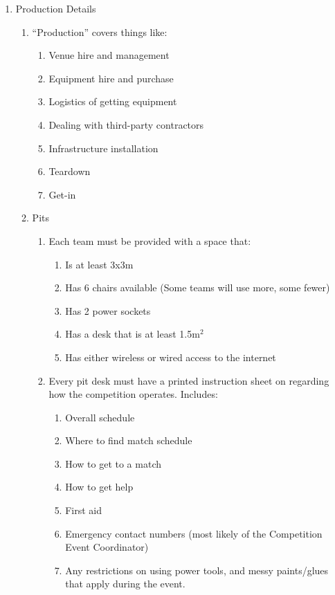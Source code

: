 \begin{enumerate}
\item Production Details
  \begin{enumerate}
  \item ``Production'' covers things like:
    \begin{enumerate}
    \item Venue hire and management
    \item Equipment hire and purchase
    \item Logistics of getting equipment
    \item Dealing with third-party contractors
    \item Infrastructure installation
    \item Teardown
    \item Get-in
    \end{enumerate}

  \item Pits
    \begin{enumerate}
    \item Each team must be provided with a space that:
      \begin{enumerate}
      \item Is at least 3x3m
      \item Has 6 chairs available (Some teams will use more, some fewer)
      \item Has 2 power sockets
      \item Has a desk that is at least 1.5m$^2$
      \item Has either wireless or wired access to the internet
      \end{enumerate}

    \item Every pit desk must have a printed instruction sheet on regarding how the competition operates.  Includes:
      \begin{enumerate}
      \item Overall schedule
      \item Where to find match schedule
      \item How to get to a match
      \item How to get help
      \item First aid
      \item Emergency contact numbers (most likely of the Competition Event Coordinator)
      \item Any restrictions on using power tools, and messy paints/glues that apply during the event.
      \end{enumerate}
    \end{enumerate}


\end{enumerate}
\end{enumerate}
